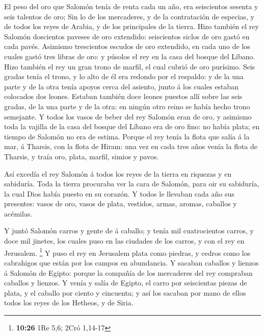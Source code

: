  El peso del oro que Salomón tenía de renta cada un año,
era seiscientos sesenta y seis talentos de oro;  Sin lo
de los mercaderes, y de la contratación de especias, y de todos los
reyes de Arabia, y de los principales de la tierra.  Hizo
también el rey Salomón doscientos paveses de oro extendido: seiscientos
siclos de oro gastó en cada pavés.  Asimismo trescientos
escudos de oro extendido, en cada uno de los cuales gastó tres libras de
oro: y púsolos el rey en la casa del bosque del Líbano. 
Hizo también el rey un gran trono de marfil, el cual cubrió de oro
purísimo.  Seis gradas tenía el trono, y lo alto de él
era redondo por el respaldo: y de la una parte y de la otra tenía apoyos
cerca del asiento, junto á los cuales estaban colocados dos leones.
 Estaban también doce leones puestos allí sobre las seis
gradas, de la una parte y de la otra: en ningún otro reino se había
hecho trono semejante.  Y todos los vasos de beber del
rey Salomón eran de oro, y asimismo toda la vajilla de la casa del
bosque del Líbano era de oro fino: no había plata; en tiempo de Salomón
no era de estima.  Porque el rey tenía la flota que salía
á la mar, á Tharsis, con la flota de Hiram: una vez en cada tres años
venía la flota de Tharsis, y traía oro, plata, marfil, simios y pavos.

 Así excedía el rey Salomón á todos los reyes de la
tierra en riquezas y en sabiduría.  Toda la tierra
procuraba ver la cara de Salomón, para oir su sabiduría, la cual Dios
había puesto en su corazón.  Y todos le llevaban cada año
sus presentes: vasos de oro, vasos de plata, vestidos, armas, aromas,
caballos y acémilas.

 Y juntó Salomón carros y gente de á caballo; y tenía mil
cuatrocientos carros, y doce mil jinetes, los cuales puso en las
ciudades de los carros, y con el rey en Jerusalem. \footnote{\textbf{10:26}
  1Re 5,6; 2Cró 1,14-17}  Y puso el rey en Jerusalem
plata como piedras, y cedros como los cabrahigos que están por los
campos en abundancia.  Y sacaban caballos y lienzos á
Salomón de Egipto: porque la compañía de los mercaderes del rey
compraban caballos y lienzos.  Y venía y salía de Egipto,
el carro por seiscientas piezas de plata, y el caballo por ciento y
cincuenta; y así los sacaban por mano de ellos todos los reyes de los
Hetheos, y de Siria.

